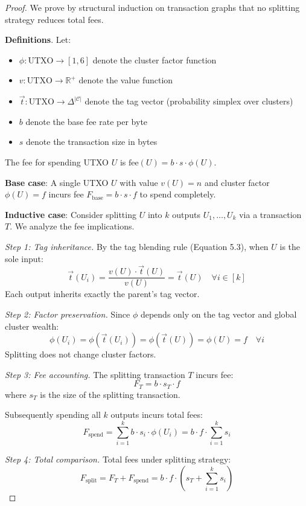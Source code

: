 \begin{proof}
We prove by structural induction on transaction graphs that no splitting
strategy reduces total fees.

\textbf{Definitions}. Let:
\begin{itemize}
  \item $\phi: \text{UTXO} \to [1, 6]$ denote the cluster factor function
  \item $v: \text{UTXO} \to \mathbb{R}^+$ denote the value function
  \item $\vec{t}: \text{UTXO} \to \Delta^{|\mathcal{C}|}$ denote the tag vector
    (probability simplex over clusters)
  \item $b$ denote the base fee rate per byte
  \item $s$ denote the transaction size in bytes
\end{itemize}

The fee for spending UTXO $U$ is $\text{fee}(U) = b \cdot s \cdot \phi(U)$.

\textbf{Base case}: A single UTXO $U$ with value $v(U) = n$ and cluster
factor $\phi(U) = f$ incurs fee $F_{\text{base}} = b \cdot s \cdot f$ to
spend completely.

\textbf{Inductive case}: Consider splitting $U$ into $k$ outputs
$U_1, \ldots, U_k$ via a transaction $T$. We analyze the fee implications.

\emph{Step 1: Tag inheritance.}
By the tag blending rule (Equation 5.3), when $U$ is the sole input:
\[
\vec{t}(U_i) = \frac{v(U) \cdot \vec{t}(U)}{v(U)} = \vec{t}(U) \quad \forall i \in [k]
\]
Each output inherits exactly the parent's tag vector.

\emph{Step 2: Factor preservation.}
Since $\phi$ depends only on the tag vector and global cluster wealth:
\[
\phi(U_i) = \phi(\vec{t}(U_i)) = \phi(\vec{t}(U)) = \phi(U) = f \quad \forall i
\]
Splitting does not change cluster factors.

\emph{Step 3: Fee accounting.}
The splitting transaction $T$ incurs fee:
\[
F_T = b \cdot s_T \cdot f
\]
where $s_T$ is the size of the splitting transaction.

Subsequently spending all $k$ outputs incurs total fees:
\[
F_{\text{spend}} = \sum_{i=1}^{k} b \cdot s_i \cdot \phi(U_i) = b \cdot f \cdot \sum_{i=1}^{k} s_i
\]

\emph{Step 4: Total comparison.}
Total fees under splitting strategy:
\[
F_{\text{split}} = F_T + F_{\text{spend}} = b \cdot f \cdot \left( s_T + \sum_{i=1}^{k} s_i \right)
\]


\end{proof}
